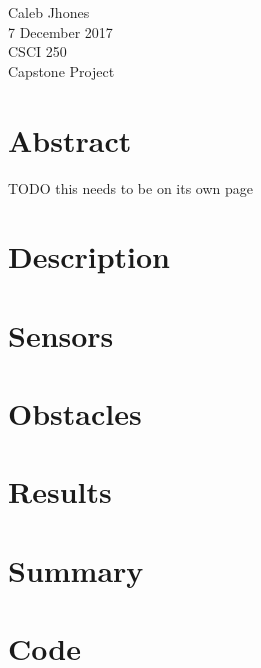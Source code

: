 \documentclass[11pt] {article}
\begin{document}
\noindent{}Caleb Jhones \\
\noindent{}7 December 2017\\
\noindent{}CSCI 250\\
\noindent{}Capstone Project\\

\onehalfspacing
\setlength\parindent{0.5in} %

\section{Abstract}
TODO this needs to be on its own page %

\section{Description}

\section{Sensors}

\section{Obstacles}

\section{Results}

\section{Summary}

\section{Code}
\end{document}
